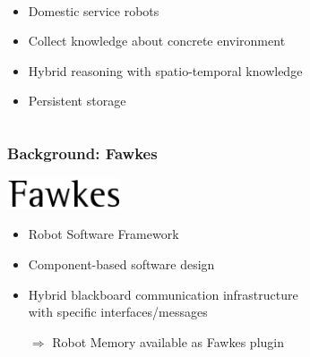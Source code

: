 \begin{frame}
\begin{columns}
\begin{column}{0.5\textwidth}
\begin{flushright}
    \end{flushright}
  \begin{description}[]
  \item[RoboCup@Home] \hfill \\
    \begin{itemize}
    \item Domestic service robots
    \item Collect knowledge about concrete environment
    \item Hybrid reasoning with spatio-temporal knowledge
    \item Persistent storage
    \end{itemize}
  \end{description}    
    \end{column}
  \end{columns}
  \end{frame}

\begin{frame}
  \frametitle{Background: Fawkes}
  \includegraphics[width=0.25\textwidth]{../thesis/img/fawkes}  
  \bigskip
  \begin{itemize}
    \item Robot Software Framework %
    \item Component-based software design %
    \item Hybrid blackboard communication infrastructure\\ with specific interfaces/messages %
      \skip
    \item[$\Rightarrow$] Robot Memory available as Fawkes plugin
  \end{itemize}
\end{frame}

